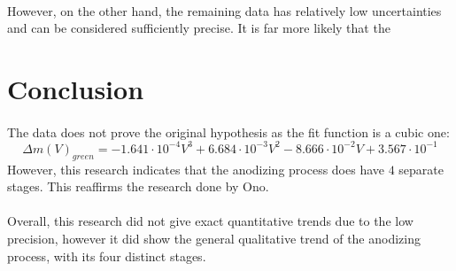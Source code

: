 \documentclass[a4paper]{article}
\begin{document}
\paragraph*{}
However, on the other hand, the remaining data has relatively low uncertainties
and can be considered sufficiently precise. It is far more likely that the 

\section{Conclusion}

\paragraph*{}
The data does not prove the original hypothesis as the fit function is a cubic
one:
$$\Delta m (V)_{green} = -1.641 \cdot 10^{-4} V^3 + 6.684 \cdot 10^{-3} V^2 -
  8.666 \cdot 10^{-2} V + 3.567 \cdot 10^{-1}$$
However, this research indicates that the anodizing process does have $4$
separate stages. This reaffirms the research done by Ono.

\paragraph*{}
Overall, this research did not give exact quantitative trends due to the low
precision, however it did show the general qualitative trend of the anodizing
process, with its four distinct stages.

\singlespacing
\clearpage
\pagebreak
{}
\end{document}
